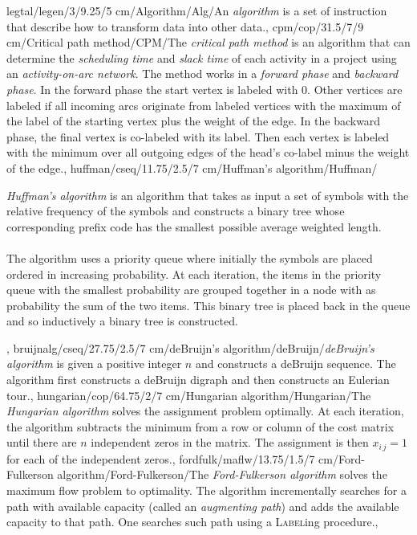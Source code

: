 legtal/legen/3/9.25/5 cm/Algorithm/Alg/{An \emph{algorithm} is a set of instruction that describe how to transform data into other data.},
cpm/cop/31.5/7/9 cm/{Critical path method}/{CPM}/{The \emph{critical path method} is an algorithm that can determine the \emph{scheduling time} and \emph{slack time} of each activity in a project using an \emph{activity-on-arc network}. The method works in a \emph{forward phase} and \emph{backward phase}. In the forward phase the start vertex is labeled with $0$. Other vertices are labeled if all incoming arcs originate from labeled vertices with the maximum of the label of the starting vertex plus the weight of the edge. In the backward phase, the final vertex is co-labeled with its label. Then each vertex is labeled with the minimum over all outgoing edges of the head's co-label minus the weight of the edge.},
huffman/cseq/11.75/2.5/7 cm/{Huffman's algorithm}/{Huffman}/{\emph{Huffman's algorithm} is an algorithm that takes as input a set of symbols with the relative frequency of the symbols and constructs a binary tree whose corresponding prefix code has the smallest possible average weighted length.\paragraph{}The algorithm uses a priority queue where initially the symbols are placed ordered in increasing probability. At each iteration, the items in the priority queue with the smallest probability are grouped together in a node with as probability the sum of the two items. This binary tree is placed back in the queue and so inductively a binary tree is constructed.},
bruijnalg/cseq/27.75/2.5/7 cm/{deBruijn's algorithm}/{deBruijn}/{\emph{deBruijn's algorithm} is given a positive integer $n$ and constructs a deBruijn sequence. The algorithm first constructs a deBruijn digraph and then constructs an Eulerian tour.},
hungarian/cop/64.75/2/7 cm/{Hungarian algorithm}/{Hungarian}/{The \emph{Hungarian algorithm} solves the assignment problem optimally. At each iteration, the algorithm subtracts the minimum from a row or column of the cost matrix until there are $n$ independent zeros in the matrix. The assignment is then $x_{i\,j}=1$ for each of the independent zeros.},
fordfulk/maflw/13.75/1.5/7 cm/{Ford-Fulkerson algorithm}/{Ford-Fulkerson}/{The \emph{Ford-Fulkerson algorithm} solves the maximum flow problem to optimality. The algorithm incrementally searches for a path with available capacity (called an \emph{augmenting path}) and adds the available capacity to that path. One searches such path using a \textsc{Label}ing procedure.},
